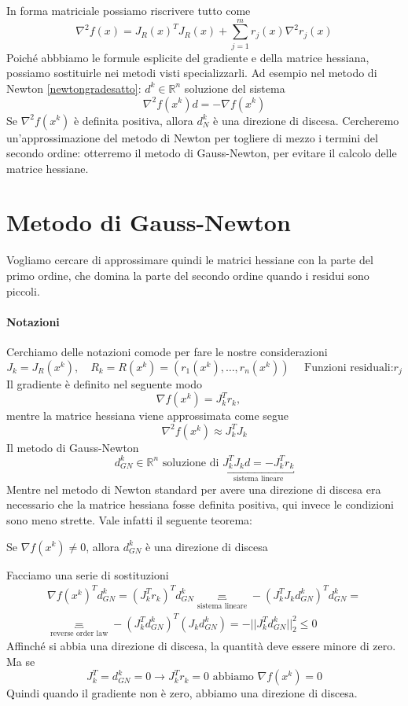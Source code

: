 In forma matriciale possiamo riscrivere tutto come
$$ \nabla^{2}f(x) = J_R(x)^{T}J_R(x) + 
 \displaystyle \sum_{j=1}^{m} r_j(x) \nabla^{2} r_j(x)$$
Poich\'e abbbiamo le formule esplicite del gradiente e della matrice
hessiana, possiamo sostituirle nei metodi visti
specializzarli.  Ad esempio nel metodo di Newton \ref{newtongradesatto}: $d^{k} \in
\mathbb{R}^{n}$ soluzione del sistema
$$ \nabla^{2}f(x^{k})d = - \nabla f(x^{k}) $$
Se $\nabla^{2} f(x^{k})$ è definita positiva, allora $d_{N}^{k}$ è una
direzione di discesa.  Cercheremo un'approssimazione del metodo di
Newton per togliere di mezzo i termini del secondo ordine: otterremo
il metodo di Gauss-Newton, per evitare il calcolo delle matrice
hessiane.

\section{Metodo di Gauss-Newton}
Vogliamo cercare di approssimare quindi le matrici hessiane con 
la parte del primo ordine, che domina la parte del secondo
ordine quando i residui sono piccoli.

\paragraph{Notazioni}
Cerchiamo delle notazioni comode per fare le nostre
considerazioni
$$ J_k = J_{R}(x^{k}), \quad R_k = R(x^k)= (r_1(x^{k}), \ldots,
r_n(x^{k}))
\quad
\text{ Funzioni residuali:$r_j$
}
$$
Il gradiente \`e definito nel seguente modo
$$ \nabla f(x^{k}) = J_{k}^{T}r_k,\quad$$
mentre la matrice hessiana viene approssimata
come segue
$$\nabla^{2}f(x^{k}) \approx J_k^{T}J_k $$
Il metodo di Gauss-Newton 
$$ d^{k}_{GN} \in \mathbb{R}^{n} 
\text{ soluzione di } \underbracket{J_{k}^{T}J_kd = - J_k^{T}r_k}_{\text{sistema lineare}}$$
Mentre nel metodo di Newton standard per avere una direzione di discesa
era necessario che la matrice hessiana fosse definita positiva,
qui invece le condizioni sono meno strette.
Vale infatti il seguente teorema:

\begin{theo}
Se $\nabla f(x^{k}) \neq 0$, allora $d_{GN}^{k}$ è una direzione
di discesa
\end{theo}
\begin{thproof}
Facciamo una serie di sostituzioni
$$ 
\begin{array}{l}
\nabla f(x^{k})^{T}d_{GN}^{k} = 
(J_k^{T}r_k)^{T} d_{GN}^{k}  \underbracket{=}_{\text{sistema lineare}} 
-(J_k^{T} J_{k} d_{GN}^{k})^{T} d_{GN}^{k} = \\
\underbracket{=}_{\text{reverse order law}} 
-(J_{k}^{T} d_{GN}^{k})^{T}(J_{k}d_{GN}^{k})
= - ||J_k^{T} d_{GN}^{k}||_{2}^{2} \leq 0 
\end{array}
$$
Affinch\'e si abbia una direzione di discesa,
la quantit\`a deve essere minore di zero.
Ma se
$$ J_{k}^{T} = d_{GN}^{k} = 0 \rightarrow
J_{k}^{T}r_k = 0 \text{ abbiamo } \nabla f(x^{k}) = 0 $$
Quindi quando il gradiente non \`e zero, abbiamo una
direzione di discesa.
\end{thproof}

